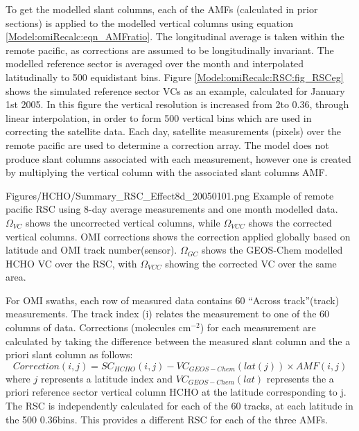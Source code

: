     To get the modelled slant columns, each of the AMFs (calculated in prior sections) is applied to the modelled vertical columns using equation \ref{Model:omiRecalc:eqn_AMFratio}.
    The longitudinal average is taken within the remote pacific, as corrections are assumed to be longitudinally invariant.
    The modelled reference sector is averaged over the month and interpolated latitudinally to 500 equidistant bins.
    Figure \ref{Model:omiRecalc:RSC:fig_RSCeg} shows the simulated reference sector VCs as an example, calculated for January 1st 2005.
    In this figure the vertical resolution is increased from 2\degr to 0.36\degr, through linear interpolation, in order to form 500 vertical bins which are used in correcting the satellite data.
    Each day, satellite measurements (pixels) over the remote pacific are used to determine a correction array.
    The model does not produce slant columns associated with each measurement, however one is created by multiplying the vertical column with the associated slant columns AMF.
    
    {Figures/HCHO/Summary_RSC_Effect8d_20050101.png}
    {%
      Example of remote pacific RSC using 8-day average measurements and one month modelled data.
      $\Omega_{VC}$ shows the uncorrected vertical columns, while $\Omega_{VCC}$ shows the corrected vertical columns.
      OMI corrections shows the correction applied globally based on latitude and OMI track number(sensor).
      $\Omega_{GC}$ shows the GEOS-Chem modelled HCHO VC over the RSC, with $\Omega_{VCC}$ showing the corrected VC over the same area.
    }
    {\label{Model:omiRecalc:RSC:fig_RSCeg}}
    
    For OMI swaths, each row of measured data contains 60 ``Across track''(track) measurements.
    The track index (i) relates the measurement to one of the 60 columns of data.
    Corrections (molecules cm$^{-2}$) for each measurement are calculated by taking the difference between the measured slant column and the a priori slant column as follows:
    \begin{equation} \label{Model:omiRecalc:eqn_RSC}
      Correction(i,j) = SC_{HCHO}(i,j) - VC_{GEOS-Chem}(lat(j)) \times {AMF}(i,j)
    \end{equation}
    where $j$ represents a latitude index and $VC_{GEOS-Chem}(lat)$ represents the a priori reference sector vertical column HCHO at the latitude corresponding to j.
    The RSC is independently calculated for each of the 60 tracks, at each latitude in the 500 0.36\degr bins.
    This provides a different RSC for each of the three AMFs.
    
